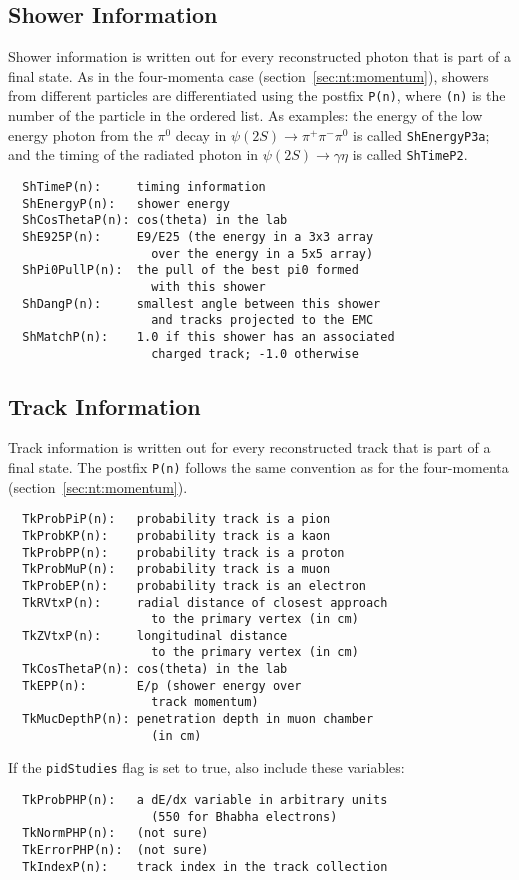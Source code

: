 \documentclass[11pt,a4paper]{define/cepcnote}
\begin{document}
\subsection{Shower Information}
\label{sec:nt:shower}

Shower information is written out for every reconstructed photon that is part of a final state.  As in the four-momenta case (section~\ref{sec:nt:momentum}), showers from different particles are differentiated using the postfix {\tt P(n)}, where {\tt (n)} is the number of the particle in the ordered list.  As examples: the energy of the low energy photon from the $\pi^0$ decay in $\psi(2S)\to\pi^+\pi^-\pi^0$ is called {\tt ShEnergyP3a}; and the timing of the radiated photon in $\psi(2S)\to\gamma\eta$ is called {\tt ShTimeP2}.
\begin{verbatim}
  ShTimeP(n):     timing information
  ShEnergyP(n):   shower energy
  ShCosThetaP(n): cos(theta) in the lab
  ShE925P(n):     E9/E25 (the energy in a 3x3 array
                    over the energy in a 5x5 array)
  ShPi0PullP(n):  the pull of the best pi0 formed
                    with this shower
  ShDangP(n):     smallest angle between this shower
                    and tracks projected to the EMC
  ShMatchP(n):    1.0 if this shower has an associated
                    charged track; -1.0 otherwise
\end{verbatim}

\subsection{Track Information}
\label{sec:nt:track}

Track information is written out for every reconstructed track that is part of a final state.  The postfix {\tt P(n)} follows the same convention as for the four-momenta (section~\ref{sec:nt:momentum}).
\begin{verbatim}
  TkProbPiP(n):   probability track is a pion
  TkProbKP(n):    probability track is a kaon
  TkProbPP(n):    probability track is a proton
  TkProbMuP(n):   probability track is a muon
  TkProbEP(n):    probability track is an electron
  TkRVtxP(n):     radial distance of closest approach
                    to the primary vertex (in cm)
  TkZVtxP(n):     longitudinal distance
                    to the primary vertex (in cm)
  TkCosThetaP(n): cos(theta) in the lab
  TkEPP(n):       E/p (shower energy over
                    track momentum)
  TkMucDepthP(n): penetration depth in muon chamber
                    (in cm)
\end{verbatim}
If the {\tt pidStudies} flag is set to true, also include these variables:
\begin{verbatim}
  TkProbPHP(n):   a dE/dx variable in arbitrary units
                    (550 for Bhabha electrons)
  TkNormPHP(n):   (not sure)
  TkErrorPHP(n):  (not sure)
  TkIndexP(n):    track index in the track collection
\end{verbatim}
\end{document}
